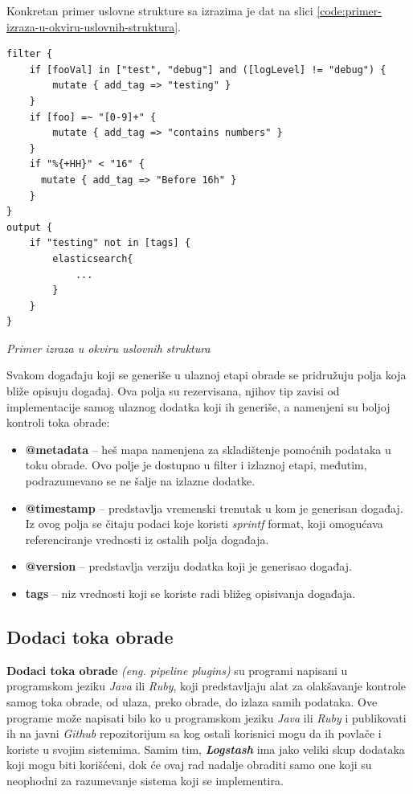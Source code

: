 \par
Konkretan primer uslovne strukture sa izrazima je dat na slici \ref{code:primer-izraza-u-okviru-uslovnih-struktura}.
\begin{listing}[H]
\begin{verbatim}
filter {
    if [fooVal] in ["test", "debug"] and ([logLevel] != "debug") {
        mutate { add_tag => "testing" }
    }
    if [foo] =~ "[0-9]+" {
        mutate { add_tag => "contains numbers" }
    }
    if "%{+HH}" < "16" {
      mutate { add_tag => "Before 16h" }
    }    
}
output {
    if "testing" not in [tags] {
        elasticsearch{
            ...
        }
    }
}
\end{verbatim}
\caption{\textit{Primer izraza u okviru uslovnih struktura}}
\label{code:primer-izraza-u-okviru-uslovnih-struktura}
\end{listing}

\par
Svakom događaju koji se generiše u ulaznoj etapi obrade se pridružuju polja koja bliže opisuju događaj. Ova polja su rezervisana, njihov tip zavisi od implementacije samog ulaznog dodatka koji ih generiše, a namenjeni su boljoj kontroli toka obrade:
\begin{itemize}
    \item \textbf{@metadata} – heš mapa namenjena za skladištenje pomoćnih podataka u toku obrade. Ovo polje je dostupno u filter i izlaznoj etapi, međutim, podrazumevano se ne šalje na izlazne dodatke.
    \item \textbf{@timestamp} – predstavlja vremenski trenutak u kom je generisan događaj. Iz ovog polja se čitaju podaci koje koristi \textit{sprintf} format, koji omogućava referenciranje vrednosti iz ostalih polja događaja.
    \item \textbf{@version} – predstavlja verziju dodatka koji je generisao događaj.
    \item \textbf{tags} – niz vrednosti koji se koriste radi bližeg opisivanja događaja.
\end{itemize}

\subsection{Dodaci toka obrade}
\textbf{Dodaci toka obrade} \textit{(eng. pipeline plugins)} su programi napisani u programskom jeziku \textit{Java} ili \textit{Ruby}, koji predstavljaju alat za olakšavanje kontrole samog toka obrade, od ulaza, preko obrade, do izlaza samih podataka. Ove programe može napisati bilo ko u programskom jeziku \textit{Java} ili \textit{Ruby} i publikovati ih na javni \textit{Github} repozitorijum sa kog ostali korisnici mogu da ih povlače i koriste u svojim sistemima. Samim tim, \textit{\textbf{Logstash}} ima jako veliki skup dodataka koji mogu biti korišćeni, dok će ovaj rad nadalje obraditi samo one koji su neophodni za razumevanje sistema koji se implementira.

